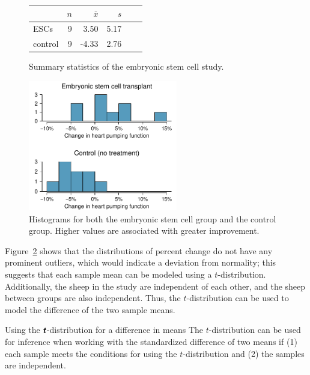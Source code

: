 \begin{figure}[h]
\centering
\begin{tabular}{l rrrrr}
\hline
\hspace{10mm}	& $n$	& $\overline{x}$	& $s$  	 \\
\hline
ESCs		& 9		& 3.50		& 5.17  	\\
control		& 9		& -4.33		& 2.76  	 \\
\hline
\end{tabular}
\caption{Summary statistics of the embryonic stem cell study.}
\label{summaryStatsForSheepHeartDataWhoReceivedMiceESCs}
\end{figure}


\begin{figure}[h]
	\centering
	\includegraphics[width=0.58\textwidth]{ch_06a_inference_for_means_oi_biostat/figures/stemCellTherapyForHearts/stemCellTherapyForHearts}
	\caption{Histograms for both the embryonic stem cell group and the control group. Higher values are associated with greater improvement.}
	\label{stemCellTherapyForHearts}
\end{figure}

Figure~\ref{stemCellTherapyForHearts} shows that the distributions of percent change do not have any prominent outliers, which would indicate a deviation from normality; this suggests that each sample mean can be modeled using a $t$-distribution. Additionally, the sheep in the study are independent of each other, and the sheep between groups are also independent. Thus, the $t$-distribution can be used to model the difference of the two sample means.

\begin{onebox}{Using the $\pmb{\MakeLowercase{t}}$-distribution for a difference in means}
\label{ConditionsForTwoSampleTDist}The $t$-distribution can be used for inference when working with the standardized difference of two means if (1) each sample meets the conditions for using the $t$-distribution and (2) the samples are independent.
\end{onebox}

